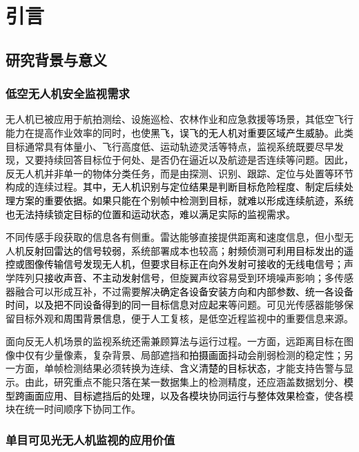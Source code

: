 \chapter{引言}

\section{研究背景与意义}

\subsection{低空无人机安全监视需求}

无人机已被应用于航拍测绘、设施巡检、农林作业和应急救援等场景，其低空飞行能力在提高作业效率的同时，也使\textcolor{black}{黑飞，误飞的无人机对重要区域产生威胁}。此类目标通常具有体量小、飞行高度低、运动轨迹灵活等特点，监视系统既要尽早发现，又要持续回答目标位于何处、是否仍在逼近以及航迹是否连续等问题。因此，反无人机并非单一的物体分类任务，而是由探测、识别、跟踪、定位与处置等环节构成的连续过程\cite{radar_cuav}。\textcolor{black}{其中，无人机识别与定位结果是判断目标危险程度、制定后续处理方案的重要依据。如果只能在个别帧中检测到目标，就难以形成连续航迹，系统也无法持续锁定目标的位置和运动状态，难以满足实际的监视需求。}

不同传感手段获取的信息各有侧重。雷达能够直接提供距离和速度信息，但小型无人机\textcolor{black}{反射回雷达的信号较弱}，系统部署成本也较高\cite{radar_cuav}；\textcolor{black}{射频侦测可利用目标发出的遥控或}\textcolor{black}{图像传输}\textcolor{black}{信号发现无人机，但要求目标正在向外发射可接收的无线电信号}\cite{rf_drone}；声学阵列\textcolor{black}{只接收声音、不主动发射信号}，但旋翼声纹容易受到环境噪声影响\cite{acoustic_drone}；多传感器融合可以形成互补，不过需要解决\textcolor{black}{确定各设备安装方向和内部参数、统一各设备时间，以及把不同设备得到的同一目标信息对应起来}等问题\cite{fusion_cuav}。可见光传感器能够保留目标外观和\textcolor{black}{周围背景信息}，便于人工复核，是低空近程监视中的重要信息来源\cite{optical_cuav}。

面向反无人机场景的监视系统还需兼顾算法与运行过程。一方面，远距离目标在图像中仅有少量像素，复杂背景、局部遮挡和\textcolor{black}{拍摄画面抖动}会削弱检测的稳定性；另一方面，单帧检测结果必须转换为连续、\textcolor{black}{含义清楚的目标状态}，才能支持告警与显示。由此，研究重点不能只落在某一数据集上的检测精度，还应涵盖数据划分、\textcolor{black}{模型跨画面应用、目标遮挡后的处理，以及各模块协同运行与整体效果检查}，使各模块在统一时间顺序下协同工作。

\subsection{单目可见光无人机监视的应用价值}


